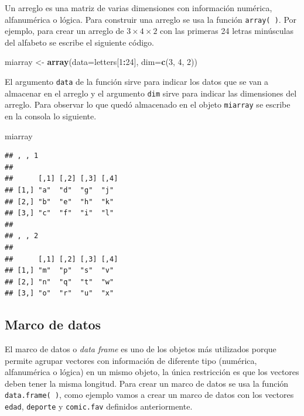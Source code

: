 \documentclass[10pt,]{krantz}
\makeatletter
\newenvironment{Shaded}{\begin{snugshade}}{\end{snugshade}}
\newcommand{\KeywordTok}[1]{\textcolor[rgb]{0.13,0.29,0.53}{\textbf{#1}}}
\newcommand{\DataTypeTok}[1]{\textcolor[rgb]{0.13,0.29,0.53}{#1}}
\newcommand{\DecValTok}[1]{\textcolor[rgb]{0.00,0.00,0.81}{#1}}
\newcommand{\StringTok}[1]{\textcolor[rgb]{0.31,0.60,0.02}{#1}}
\newcommand{\OperatorTok}[1]{\textcolor[rgb]{0.81,0.36,0.00}{\textbf{#1}}}
\newcommand{\NormalTok}[1]{#1}
\newenvironment{kframe}{%
\medskip{}
\setlength{\fboxsep}{.8em}
 \def\at@end@of@kframe{}%
 \ifinner\ifhmode%
  \def\at@end@of@kframe{\end{minipage}}%
  \begin{minipage}{\columnwidth}%
 \fi\fi%
 \def\FrameCommand##1{\hskip\@totalleftmargin \hskip-\fboxsep
 \colorbox{shadecolor}{##1}\hskip-\fboxsep
     \hskip-\linewidth \hskip-\@totalleftmargin \hskip\columnwidth}%
 \MakeFramed {\advance\hsize-\width
   \@totalleftmargin\z@ \linewidth\hsize
   \@setminipage}}%
 {\par\unskip\endMakeFramed%
 \at@end@of@kframe}
\renewenvironment{Shaded}{\begin{kframe}}{\end{kframe}}
\makeatother
\begin{document}
Un arreglo  es una matriz de varias dimensiones con
información numérica, alfanumérica o lógica. Para construir una arreglo
se usa la función \texttt{array(\ )}. Por ejemplo, para crear un arreglo
de \(3 \times 4 \times 2\) con las primeras 24 letras minúsculas del
alfabeto se escribe el siguiente código.

\begin{Shaded}
\begin{Highlighting}[]
\NormalTok{miarray <-}\StringTok{ }\KeywordTok{array}\NormalTok{(}\DataTypeTok{data=}\NormalTok{letters[}\DecValTok{1}\OperatorTok{:}\DecValTok{24}\NormalTok{], }\DataTypeTok{dim=}\KeywordTok{c}\NormalTok{(}\DecValTok{3}\NormalTok{, }\DecValTok{4}\NormalTok{, }\DecValTok{2}\NormalTok{))}
\end{Highlighting}
\end{Shaded}

El argumento \texttt{data} de la función sirve para indicar los datos
que se van a almacenar en el arreglo y el argumento \texttt{dim} sirve
para indicar las dimensiones del arreglo. Para observar lo que quedó
almacenado en el objeto \texttt{miarray} se escribe en la consola lo
siguiente.

\begin{Shaded}
\begin{Highlighting}[]
\NormalTok{miarray}
\end{Highlighting}
\end{Shaded}

\begin{verbatim}
## , , 1
## 
##      [,1] [,2] [,3] [,4]
## [1,] "a"  "d"  "g"  "j" 
## [2,] "b"  "e"  "h"  "k" 
## [3,] "c"  "f"  "i"  "l" 
## 
## , , 2
## 
##      [,1] [,2] [,3] [,4]
## [1,] "m"  "p"  "s"  "v" 
## [2,] "n"  "q"  "t"  "w" 
## [3,] "o"  "r"  "u"  "x"
\end{verbatim}

\subsection{Marco de datos}

El marco de datos  o \textit{data frame} es uno de
los objetos más utilizados porque permite agrupar vectores con
información de diferente tipo (numérica, alfanumérica o lógica) en un
mismo objeto, la única restricción es que los vectores deben tener la
misma longitud. Para crear un marco de datos se usa la función
\texttt{data.frame(\ )}, como ejemplo vamos a crear un marco de datos
con los vectores \texttt{edad}, \texttt{deporte} y \texttt{comic.fav}
definidos anteriormente.
\end{document}
